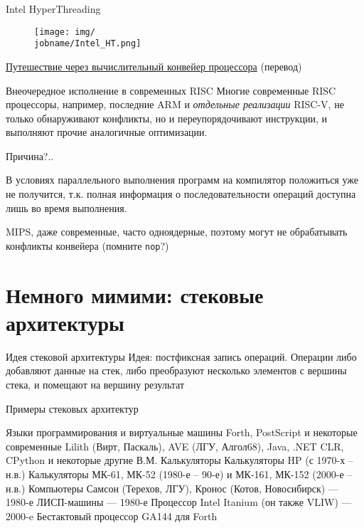 \documentclass[xetex,aspectratio=43]{beamer}
\begin{document}
\begin{frame}{Intel HyperThreading}
    \begin{figure}
        \texttt{[image: img/\\jobname/Intel\_HT.png]}
    \end{figure}

    \href{https://habr.com/ru/post/182002/}{Путешествие через вычислительный конвейер процессора} (перевод)
\end{frame}

\begin{frame}{Внеочередное исполнение в современных RISC}
    Многие современные RISC процессоры, например, последние ARM и \emph{отдельные реализации} RISC-V, не только     обнаруживают конфликты, но и переупорядочивают инструкции, и выполняют
    прочие аналогичные оптимизации.

    Причина?..

    \pause

    В условиях параллельного выполнения программ на компилятор положиться
    уже не получится, т.к. полная информация о последовательности операций
    доступна лишь во время выполнения.

    MIPS, даже современные, часто одноядерные, поэтому могут не обрабатывать конфликты конвейера (помните \texttt{nop}?)
\end{frame}

\section{Немного мимими: стековые архитектуры}

\begin{frame}{Идея стековой архитектуры}
    Идея: постфиксная запись операций. Операции либо добавляют данные на стек, либо преобразуют несколько элементов с вершины стека, и помещают на вершину результат
\end{frame}

\begin{frame}{Примеры стековых архитектур}
    \begin{outline}[itemize]
        \1 Языки программирования и виртуальные машины
            \2 Forth, PostScript и некоторые современные
            \2 Lilith (Вирт, Паскаль), AVE (ЛГУ, Алгол68), Java, .NET CLR, CPython и некоторые другие В.М.
        \1 Калькуляторы
            \2 Калькуляторы HP (с 1970-х – н.в.)
            \2 Калькуляторы МК-61, МК-52 (1980-е – 90-е) и МК-161, МК-152 (2000-е – н.в.)
        \1 Компьютеры
            \2 Самсон (Терехов, ЛГУ), Кронос (Котов, Новосибирск) — 1980-е
            \2 ЛИСП-машины — 1980-е
            \2 Процессор Intel Itanium (он также VLIW) — 2000-e
            \2 Бестактовый процессор GA144 для Forth
    \end{outline}
\end{frame}
\end{document}

